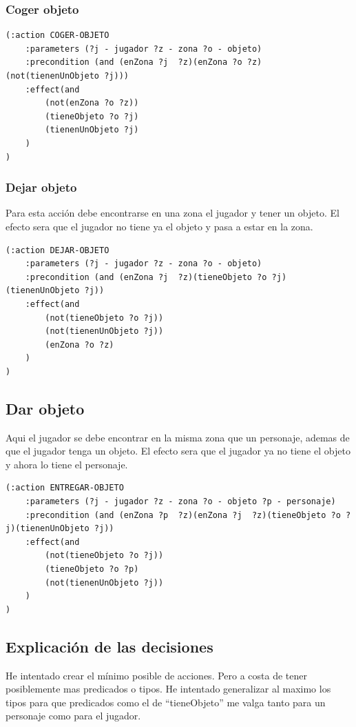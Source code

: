 \documentclass[12pt,a4paper]{article}
\begin{document}
\subsubsection{Coger objeto}
\begin{lstlisting}
(:action COGER-OBJETO
	:parameters (?j - jugador ?z - zona ?o - objeto)
	:precondition (and (enZona ?j  ?z)(enZona ?o ?z)(not(tienenUnObjeto ?j)))
	:effect(and 
		(not(enZona ?o ?z))
		(tieneObjeto ?o ?j)
		(tienenUnObjeto ?j)
	)
)

\end{lstlisting}
\subsubsection{Dejar objeto}
Para esta acción debe encontrarse en una zona el jugador y tener un objeto. El efecto sera que el jugador no tiene ya el objeto y pasa a estar en la zona. 
\begin{lstlisting}
(:action DEJAR-OBJETO
	:parameters (?j - jugador ?z - zona ?o - objeto)
	:precondition (and (enZona ?j  ?z)(tieneObjeto ?o ?j)(tienenUnObjeto ?j))
	:effect(and 
		(not(tieneObjeto ?o ?j))
		(not(tienenUnObjeto ?j))
		(enZona ?o ?z)
	)
)
\end{lstlisting}
\subsection{Dar objeto}
Aqui el jugador se debe encontrar en la misma zona que un personaje, ademas de que el jugador tenga un objeto. El efecto sera que el jugador ya no tiene el objeto y ahora lo tiene el personaje. 
\begin{lstlisting}
(:action ENTREGAR-OBJETO
	:parameters (?j - jugador ?z - zona ?o - objeto ?p - personaje)
	:precondition (and (enZona ?p  ?z)(enZona ?j  ?z)(tieneObjeto ?o ?j)(tienenUnObjeto ?j))
	:effect(and 
		(not(tieneObjeto ?o ?j))
		(tieneObjeto ?o ?p)
		(not(tienenUnObjeto ?j))
	)
)
\end{lstlisting}
\subsection{Explicación de las decisiones}
He intentado crear el mínimo posible de acciones. Pero a costa de tener posiblemente mas predicados o tipos. He intentado generalizar al maximo los tipos para que predicados como el de ``tieneObjeto'' me valga tanto para un personaje como para el jugador.
\end{document}
